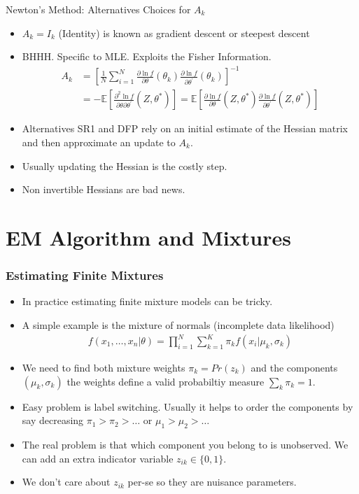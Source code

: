 \begin{frame}{Newton's Method: Alternatives}
Choices for $A_k$
\begin{itemize}
\item $A_k= I_{k}$ (Identity) is known as \alert{gradient descent} or \alert{steepest descent}
\item BHHH. Specific to MLE. Exploits the \alert{Fisher Information}.
\begin{align*}
A _ { k } 
&= \left[ \frac { 1 } { N } \sum _ { i = 1 } ^ { N } \frac { \partial \ln f } { \partial \theta } \left( \theta _ { k } \right) \frac { \partial \ln f } { \partial \theta ^ { \prime } } \left( \theta _ { k } \right) \right] ^ { - 1 }\\
&=- \mathbb { E } \left[ \frac { \partial ^ { 2 } \ln f } { \partial \theta \partial \theta ^ { \prime } } \left( Z , \theta ^ { * } \right) \right] 
= \mathbb { E } \left[ \frac { \partial \ln f } { \partial \theta } \left( Z , \theta ^ { * } \right) \frac { \partial \ln f } { \partial \theta ^ { \prime } } \left( Z , \theta ^ { * } \right) \right]
\end{align*}
\item Alternatives \alert{SR1} and \alert{DFP} rely on an initial estimate of the Hessian matrix and then approximate an update to $A_k$.
\item Usually updating the Hessian is the costly step.
\item Non invertible Hessians are bad news.
\end{itemize}
\end{frame}

\section{EM Algorithm and Mixtures}

\begin{frame}
\frametitle{Estimating Finite Mixtures}
\begin{itemize}
\item In practice estimating finite mixture models can be tricky.
\item A simple example is the mixture of normals (incomplete data likelihood)
\begin{eqnarray*}
f(x_1,\ldots,x_n | \theta) = \prod_{i=1}^N \sum_{k=1}^K \pi_k f(x_i | \mu_k, \sigma_k)
\end{eqnarray*}
\item We need to find both mixture weights $\pi_k = Pr(z_k)$ and the components $(\mu_k,\sigma_k)$ the weights define a valid probabiltiy measure $\sum_k \pi_k = 1$.
\item Easy problem is \alert{label switching}. Usually it helps to order the components by say decreasing $\pi_1 > \pi_2 > \ldots$ or  $\mu_1 > \mu_2 > \ldots$ 
\item The real problem is that which component you belong to is unobserved. We can add an extra indicator variable $z_{ik} \in \{0,1\}$.
\item We don't care about $z_{ik}$ per-se so they are \alert{nuisance parameters}.
\end{itemize}
\end{frame}

